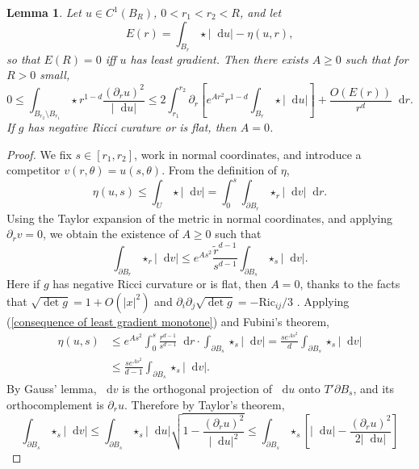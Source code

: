\documentclass[reqno,10pt]{amsart}
\newcommand{\Ric}{\mathrm{Ric}}
\newcommand*\dif{\mathop{}\!\mathrm{d}}
\newtheorem{lemma}[theorem]{Lemma}
\theoremstyle{definition}
\numberwithin{equation}{section}
\begin{document}
\begin{lemma}\label{monotonicity lemma}
Let $u \in C^1(B_R)$, $0 < r_1 < r_2 < R$, and let
$$E(r) = \int_{B_r} \star |\dif u| - \eta(u, r),$$
so that $E(R) = 0$ iff $u$ has least gradient. Then there exists $A \geq 0$ such that for $R > 0$ small,
\begin{equation}\label{monotonicity lemma eqn}
0 \leq \int_{B_{r_2} \setminus B_{r_1}} \star r^{1 - d}\frac{(\partial_ru)^2}{|\dif u|} \leq 2\int_{r_1}^{r_2} \partial_r \left[e^{Ar^2} r^{1-d}\int_{B_r} \star |\dif u|\right] + \frac{O(E(r))}{r^d} \dif r.
\end{equation}
If $g$ has negative Ricci curature or is flat, then $A = 0$.
\end{lemma}
\begin{proof}
We fix $s \in [r_1, r_2]$, work in normal coordinates, and introduce a competitor $v(r, \theta) = u(s, \theta)$.
From the definition of $\eta$,
\begin{equation}\label{consequence of least gradient monotone}
    \eta(u, s) \leq \int_U \star |\dif v| = \int_0^s \int_{\partial B_r} \star_r |\dif v| \dif r.
\end{equation}
Using the Taylor expansion of the metric in normal coordinates, and applying $\partial_r v = 0$, we obtain the existence of $A \geq 0$ such that
\begin{equation}\label{introduce the ricci tensor}
\int_{\partial B_r} \star_r |\dif v| \leq e^{As^2} \frac{\tilde r^{d - 1}}{s^{d - 1}} \int_{\partial B_s} \star_s |\dif v|.
\end{equation}
Here if $g$ has negative Ricci curvature or is flat, then $A = 0$, thanks to the facts that $\sqrt{\det g} = 1 + O(|x|^2)$ and $\partial_i\partial_j \sqrt{\det g} = -\Ric_{ij}/3$ \cite[Lemma 3.4]{schoen1994lectures}.
Applying (\ref{consequence of least gradient monotone}) and Fubini's theorem,
\begin{align*}
\eta(u, s) &\leq  e^{As^2} \int_0^s \frac{r^{d - 1}}{s^{d - 1}} \dif r \cdot \int_{\partial B_s} \star_s |\dif v| = \frac{s e^{As^2}}{d} \int_{\partial B_s} \star_s |\dif v|\\
&\leq \frac{s e^{As^2}}{d - 1} \int_{\partial B_s} \star_s |\dif v|.
\end{align*}
By Gauss' lemma, $\dif v$ is the orthogonal projection of $\dif u$ onto $T' \partial B_s$, and its orthocomplement is $\partial_r u$. Therefore by Taylor's theorem,
$$\int_{\partial B_s} \star_s |\dif v| \leq \int_{\partial B_s} \star_s |\dif u| \sqrt{1 - \frac{(\partial_r u)^2}{|\dif u|^2}} \leq \int_{\partial B_s} \star_s \left[|\dif u| - \frac{(\partial_r u)^2}{2 |\dif u|}\right]$$

\end{proof}
\end{document}
